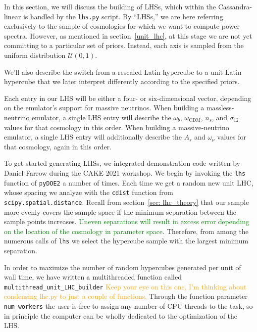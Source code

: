 In this section, we will discuss the building of LHSs, which within the
Cassandra-linear is handled by the \verb|lhs.py| script.
By ``LHSs,'' we are here referring exclusively to the
sample of cosmologies for which we want to compute power spectra.
However, as mentioned in section~\ref{unit_lhc}, at this stage we are not
yet committing to a particular set of priors. Instead, each axis is sampled
from the uniform distribution $\mathcal{U} (0, 1)$.



We'll also describe the switch from a rescaled Latin hypercube to a unit Latin hypercube that we later interpret differently according to the specified priors.

Each entry in our LHS will be either a four- or six-dimensional vector, 
depending on the emulator's support for massive neutrinos. When building a
massless-neutrino emulator, a single LHS entry will describe the $\omega_b$,
$\omega_\text{CDM}$, $n_s$, and $\sigma_{12}$ values for that cosmology in 
this order. When building a massive-neutrino emulator, a single LHS entry will 
additionally describe the $A_s$ and $\omega_\nu$ values for that cosmology, 
again in this order.

To get started generating LHSs, we integrated demonstration code written by 
Daniel Farrow  
during the CAKE 2021 workshop. We begin by invoking the \verb|lhs| function of
\verb|pyDOE2| a number of times. Each time we get a random new unit LHC, whose
spacing we analyze with the \verb|cdist| function from
\verb|scipy.spatial.distance|.  Recall from section~\ref{sec: lhc_theory} that
our sample more evenly covers the sample space if the minimum separation 
between the sample points increases. \textcolor{green}{Uneven separations will
result in excess error depending on the location of the cosmology in parameter
space}. Therefore, from among the numerous calls of \verb|lhs| we select the
hypercube sample with the largest minimum separation.

In order to maximize the number of random hypercubes generated per unit of
wall time, we have written a multithreaded function called
\verb|multithread_unit_LHC_builder| \textcolor{orange}{Keep your eye on this
one, I'm thinking about condensing lhc.py to just a couple of functions.}
Through the function parameter \verb|num_workers| the user is free to assign
any number of CPU threads to the task, so in principle the computer can be
wholly dedicated to the optimization of the LHS.  

